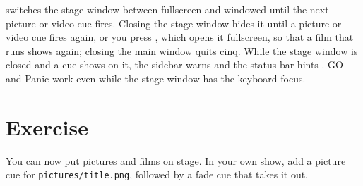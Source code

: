  switches the stage window between fullscreen and windowed until the
next picture or video cue fires.  Closing the stage window hides it until a
picture or video cue fires again, or you press , which opens it
fullscreen, so that a film that runs shows again; closing the main window
quits cinq.  While the stage window is closed and a cue shows on it, the
sidebar warns  and the status bar hints
.  GO and Panic work even while the stage window has the keyboard
focus.

\section*{Exercise}

You can now put pictures and films on stage.  In your own show, add a picture
cue for \texttt{pictures/title.png}, followed by a fade cue that takes it
out.
